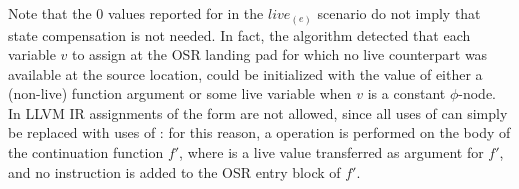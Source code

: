 Note that the $0$ values reported for  in the $live_{(e)}$ scenario do not imply that state compensation is not needed. In fact, the algorithm detected that each variable $v$ to assign at the OSR landing pad for which no live counterpart was available at the source location, could be initialized with the value of either a (non-live) function argument or some live variable when $v$ is a constant $\phi$-node. In LLVM IR assignments of the form  are not allowed, since all uses of  can simply be replaced with uses of : for this reason, a  operation is performed on the body of the continuation function $f'$, where  is a live value transferred as argument for $f'$, and no instruction is added to the OSR entry block of $f'$.
